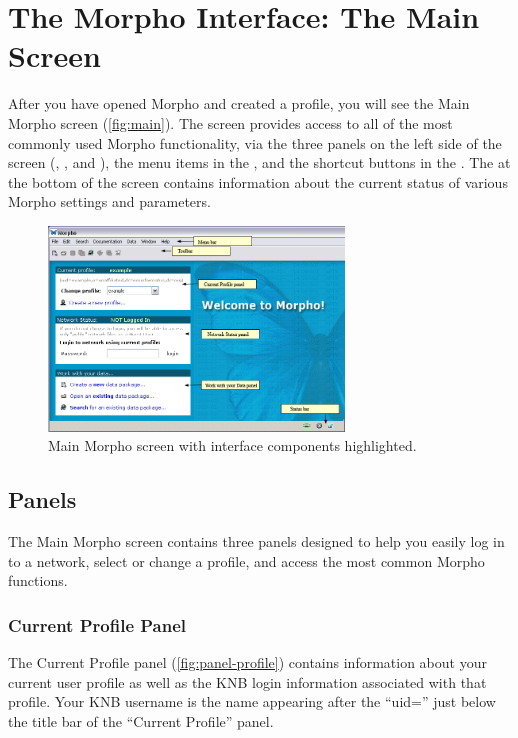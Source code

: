 \section{The Morpho Interface: The Main Screen} \label{sec:main}

After you have opened Morpho and created a profile, you will see the
Main Morpho screen (\autoref{fig:main}). The screen provides access to
all of the most commonly used Morpho functionality, via the three panels
on the left side of the screen (,
, and ), the
menu items in the , and the shortcut buttons in
the . The  at the bottom of
the screen contains information about the current status of various
Morpho settings and parameters.

\begin{figure}
  \centering
    \includegraphics[width=0.7\textwidth]{images/main.jpg}
  \caption{Main Morpho screen with interface components highlighted.}
  \label{fig:main}
\end{figure}

\subsection{Panels}

The Main Morpho screen contains three panels designed to help you easily
log in to a network, select or change a profile, and access the most
common Morpho functions.

\subsubsection[Current profile]{Current Profile Panel}
\label{sec:panel-profile}

The Current Profile panel (\autoref{fig:panel-profile}) contains
information about your current user profile as well as the KNB login
information associated with that profile. Your KNB username is the name
appearing after the ``uid='' just below the title bar of the ``Current
Profile'' panel. 


